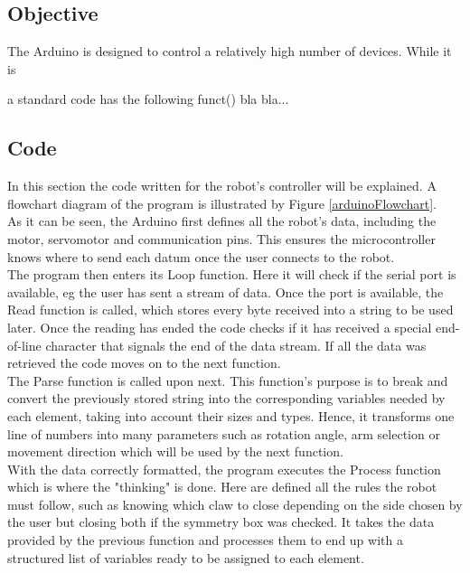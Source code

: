 \subsection{Objective}
The Arduino is designed to control a relatively high number of devices. While it is 


a standard code has the following funct() bla bla...

\newpage
\subsection{Code}

In this section the code written for the robot's controller will be explained. A flowchart diagram of the program is illustrated by Figure \ref{arduinoFlowchart}.\\

As it can be seen, the Arduino first defines all the robot's data, including the motor, servomotor and communication pins. This ensures the microcontroller knows where to send each datum once the user connects to the robot.\\

The program then enters its Loop function. Here it will check if the serial port is available, eg the user has sent a stream of data. Once the port is available, the Read function is called, which stores every byte received into a string to be used later. Once the reading has ended the code checks if it has received a special end-of-line character that signals the end of the data stream. If all the data was retrieved the code moves on to the next function.\\

The Parse function is called upon next. This function's purpose is to break and convert the previously stored string into the corresponding variables needed by each element, taking into account their sizes and types. Hence, it transforms one line of numbers into many parameters such as rotation angle, arm selection or movement direction which will be used by the next function.\\

With the data correctly formatted, the program executes the Process function which is where the "thinking" is done. Here are defined all the rules the robot must follow, such as knowing which claw to close depending on the side chosen by the user but closing both if the symmetry box was checked. It takes the data provided by the previous function and processes them to end up with a structured list of variables ready to be assigned to each element.\\

